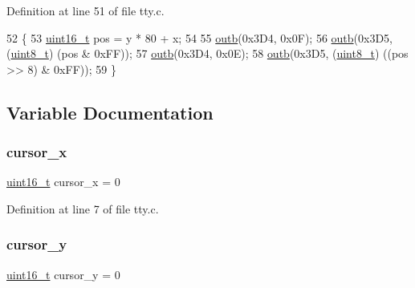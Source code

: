 Definition at line 51 of file tty.\+c.


\begin{DoxyCode}
52 \{
53     \hyperlink{a00116_a273cf69d639a59973b6019625df33e30_a273cf69d639a59973b6019625df33e30}{uint16\_t} pos = y * 80 + x;
54  
55     \hyperlink{a00131_aa37f5841c54156a4b14fc0d6f626b44f_aa37f5841c54156a4b14fc0d6f626b44f}{outb}(0x3D4, 0x0F);
56     \hyperlink{a00131_aa37f5841c54156a4b14fc0d6f626b44f_aa37f5841c54156a4b14fc0d6f626b44f}{outb}(0x3D5, (\hyperlink{a00116_aba7bc1797add20fe3efdf37ced1182c5_aba7bc1797add20fe3efdf37ced1182c5}{uint8\_t}) (pos & 0xFF));
57     \hyperlink{a00131_aa37f5841c54156a4b14fc0d6f626b44f_aa37f5841c54156a4b14fc0d6f626b44f}{outb}(0x3D4, 0x0E);
58     \hyperlink{a00131_aa37f5841c54156a4b14fc0d6f626b44f_aa37f5841c54156a4b14fc0d6f626b44f}{outb}(0x3D5, (\hyperlink{a00116_aba7bc1797add20fe3efdf37ced1182c5_aba7bc1797add20fe3efdf37ced1182c5}{uint8\_t}) ((pos >> 8) & 0xFF));
59 \}
\end{DoxyCode}


\subsection{Variable Documentation}
\mbox{\label{a00140_ae69604af0f9bd5fca2a016d0aa1ba7e1_ae69604af0f9bd5fca2a016d0aa1ba7e1}} 
\subsubsection{\texorpdfstring{cursor\+\_\+x}{cursor\_x}}
{\footnotesize\ttfamily \hyperlink{a00116_a273cf69d639a59973b6019625df33e30_a273cf69d639a59973b6019625df33e30}{uint16\+\_\+t} cursor\+\_\+x = 0}



Definition at line 7 of file tty.\+c.

\mbox{\label{a00140_a0301c5492919c401c2c1ecf52af709b0_a0301c5492919c401c2c1ecf52af709b0}} 
\subsubsection{\texorpdfstring{cursor\+\_\+y}{cursor\_y}}
{\footnotesize\ttfamily \hyperlink{a00116_a273cf69d639a59973b6019625df33e30_a273cf69d639a59973b6019625df33e30}{uint16\+\_\+t} cursor\+\_\+y = 0}




